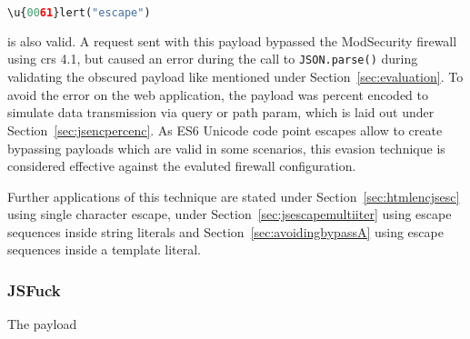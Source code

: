 \begin{lstlisting}[style=basicStyle, language=Python, caption=\textbackslash u\{0061\}lert('escape') bypass]
\u{0061}lert("escape")
\end{lstlisting}

is also valid. A request sent with this payload bypassed the ModSecurity firewall using \acrshort{crs} 4.1, but caused an error during the call to \verb|JSON.parse()| during validating the obscured payload like mentioned under Section~\ref{sec:evaluation}. 
To avoid the error on the web application, the payload was percent encoded to simulate data transmission via query or path param, which is laid out under Section~\ref{sec:jsencpercenc}. As ES6 Unicode code point escapes allow to create bypassing payloads which are valid in some scenarios, this evasion technique is considered effective against the evaluted firewall configuration.

Further applications of this technique are stated under Section~\ref{sec:htmlencjsesc} using single character escape, under Section~\ref{sec:jsescapemultiiter} using escape sequences inside string literals and Section~\ref{sec:avoidingbypassA} using escape sequences inside a template literal.

%
%
%

\subsubsection{JSFuck}
\label{sec:jsfucksingleiter}
The payload 

